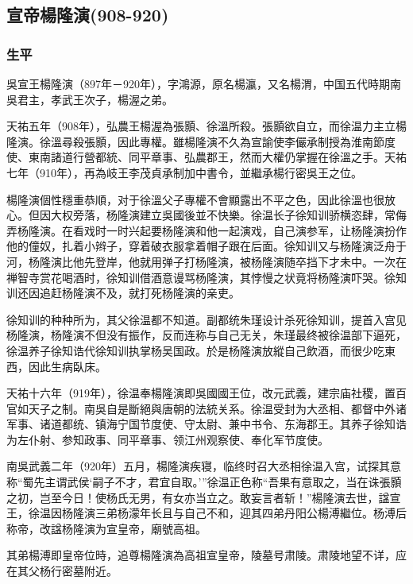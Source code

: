 
\subsection{宣帝楊隆演\tiny(908-920)}

\subsubsection{生平}

吳宣王楊隆演（897年－920年），字鴻源，原名楊瀛，又名楊渭，中国五代時期南吳君主，孝武王次子，楊渥之弟。

天祐五年（908年），弘農王楊渥為張顥、徐溫所殺。張顥欲自立，而徐温力主立楊隆演。徐溫尋殺張顥，因此專權。雖楊隆演不久為宣諭使李儼承制授為淮南節度使、東南諸道行營都統、同平章事、弘農郡王，然而大權仍掌握在徐溫之手。天祐七年（910年），再為岐王李茂貞承制加中書令，並繼承楊行密吳王之位。

楊隆演個性穩重恭順，对于徐溫父子專權不會顯露出不平之色，因此徐溫也很放心。但因大权旁落，杨隆演建立吳國後並不快樂。徐温长子徐知训骄横恣肆，常侮弄杨隆演。在看戏时一时兴起要杨隆演和他一起演戏，自己演参军，让杨隆演扮作他的僮奴，扎着小辫子，穿着破衣服拿着帽子跟在后面。徐知训又与杨隆演泛舟于河，杨隆演比他先登岸，他就用弹子打杨隆演，被杨隆演随卒挡下才未中。一次在禅智寺赏花喝酒时，徐知训借酒意谩骂杨隆演，其悖慢之状竟将杨隆演吓哭。徐知训还因追赶杨隆演不及，就打死杨隆演的亲吏。

徐知训的种种所为，其父徐温都不知道。副都统朱瑾设计杀死徐知训，提首入宫见杨隆演，杨隆演不但没有振作，反而连称与自己无关，朱瑾最终被徐温部下逼死，徐温养子徐知诰代徐知训执掌杨吴国政。於是杨隆演放縱自己飲酒，而很少吃東西，因此生病臥床。

天祐十六年（919年），徐温奉楊隆演即吳國國王位，改元武義，建宗庙社稷，置百官如天子之制。南吳自是斷絕與唐朝的法統关系。徐温受封为大丞相、都督中外诸军事、诸道都统、镇海宁国节度使、守太尉、兼中书令、东海郡王。其养子徐知诰为左仆射、参知政事、同平章事、领江州观察使、奉化军节度使。

南吳武義二年（920年）五月，楊隆演疾寝，临终时召大丞相徐温入宫，试探其意称“蜀先主谓武侯‘嗣子不才，君宜自取。’”徐温正色称“吾果有意取之，当在诛張顥之初，岂至今日！使杨氏无男，有女亦当立之。敢妄言者斩！”楊隆演去世，諡宣王，徐温因杨隆演三弟杨濛年长且与自己不和，迎其四弟丹阳公楊溥繼位。杨溥后称帝，改諡杨隆演为宣皇帝，廟號高祖。

其弟楊溥即皇帝位時，追尊楊隆演為高祖宣皇帝，陵墓号肃陵。肃陵地望不详，应在其父杨行密墓附近。


